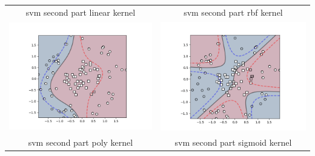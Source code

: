\documentclass{article}
\begin{document}
\begin{tabular}{c|c}
{svm second part linear kernel}&{svm second part rbf kernel}\\
\includegraphics[scale=0.4]{hw3images/svmsecondarypartpolynomialkernel.png}&\includegraphics[scale=0.4]{hw3images/svmsecondarypartsigmoidkernel.png}\\
{svm second part poly kernel}&{svm second part sigmoid kernel}\\
\end{tabular}
\end{document}
